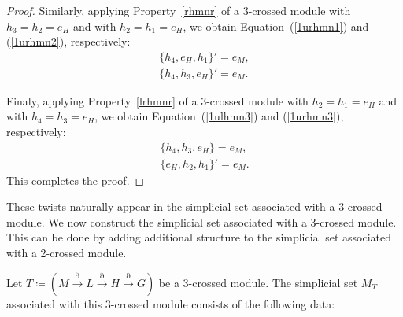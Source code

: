 \documentclass{tac}
\begin{document}
\begin{proof}
Similarly, applying Property~\ref{rhmnr} of a 3-crossed module with $h_3 = h_2 = e_H$ and with $h_2= h_1 = e_H$, we obtain Equation~(\ref{1urhmn1}) and (\ref{1urhmn2}), respectively:
\begin{align}
\label{1urhmn1}
\{h_4, e_H, h_1 \}' = e_M,\\ 
\label{1urhmn2}
\{h_4, h_3, e_H \}' = e_M.
\end{align}

Finaly, applying Property~\ref{lrhmnr} of a 3-crossed module with $h_2 = h_1 = e_H$ and with $h_4= h_3 = e_H$, we obtain Equation~(\ref{1ulhmn3}) and (\ref{1urhmn3}), respectively:
\begin{align}
\label{1ulhmn3}
\{h_4, h_3, e_H \} = e_M,\\ 
\label{1urhmn3}
\{e_H, h_2, h_1 \}' = e_M.
\end{align}
This completes the proof.

\end{proof}


These twists naturally appear in the simplicial set associated with a 3-crossed module.  
We now construct the simplicial set associated with a 3-crossed module. This can be done by adding additional structure to the simplicial set associated with a 2-crossed module.

Let \( T \coloneqq  (M \xrightarrow{\partial} L \xrightarrow{\partial} H \xrightarrow{\partial} G) \) be a 3-crossed module.  
The simplicial set \( M_T \) associated with this 3-crossed module consists of the following data:
\end{document}

